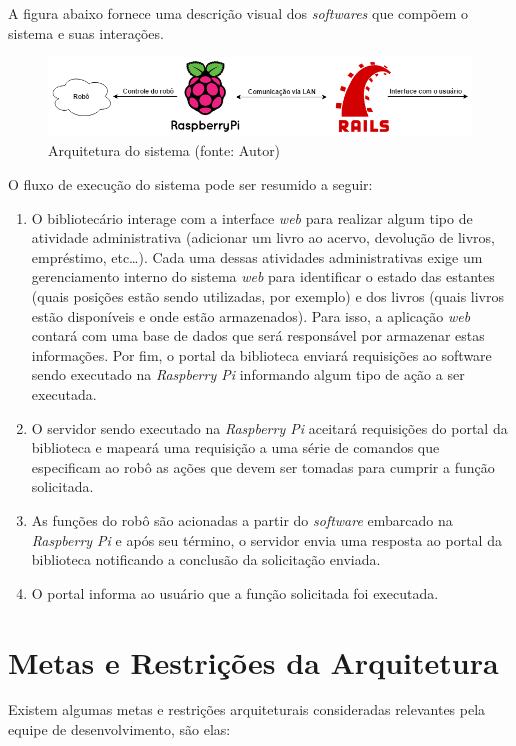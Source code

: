 A figura abaixo fornece uma descrição visual dos \textit{softwares} que compõem o sistema e suas interações.

\begin{figure}[!h]
\centering
\includegraphics[scale=0.50, angle = 360]{figuras/arquitetura_1}
\caption[]{Arquitetura do sistema (fonte: Autor)}
\end{figure}
\FloatBarrier

O fluxo de execução do sistema pode ser resumido a seguir:

\begin{enumerate}
    \item O bibliotecário interage com a interface \textit{web} para realizar algum tipo de atividade administrativa (adicionar um livro ao acervo, devolução de livros, empréstimo, etc…). Cada uma dessas atividades administrativas exige um gerenciamento interno do sistema \textit{web} para identificar o estado das estantes (quais posições estão sendo utilizadas, por exemplo) e dos livros (quais livros estão disponíveis e onde estão armazenados). Para isso, a aplicação \textit{web} contará com uma base de dados que será responsável por armazenar estas informações. Por fim, o portal da biblioteca enviará requisições ao software sendo executado na \textit{Raspberry Pi} informando algum tipo de ação a ser executada.

    \item O servidor sendo executado na \textit{Raspberry Pi} aceitará requisições do portal da biblioteca e mapeará uma requisição a uma série de comandos que especificam ao robô as ações que devem ser tomadas para cumprir a função solicitada.

    \item As funções do robô são acionadas a partir do \textit{software} embarcado na \textit{Raspberry Pi} e após seu término, o servidor envia uma resposta ao portal da biblioteca notificando a conclusão da solicitação enviada.

    \item O portal informa ao usuário que a função solicitada foi executada.
\end{enumerate}

\section{Metas e Restrições da Arquitetura}
Existem algumas metas e restrições arquiteturais consideradas relevantes pela equipe de desenvolvimento, são elas:

